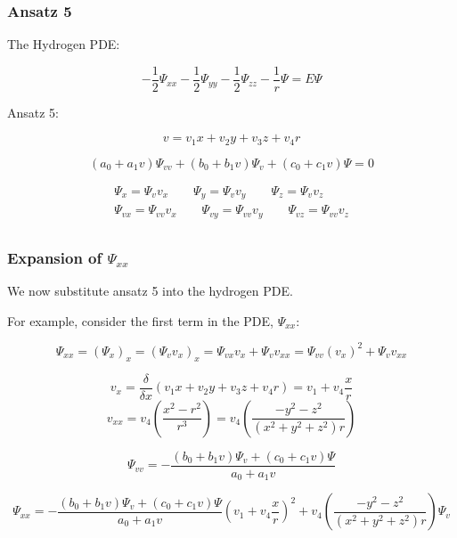 \documentclass{beamer}
\begin{document}
\begin{frame}
\frametitle{Ansatz 5}

\begin{center}

The Hydrogen PDE:

\[ - \frac{1}{2} \Psi_{xx} - \frac{1}{2} \Psi_{yy} - \frac{1}{2} \Psi_{zz} - \frac{1}{r} \Psi = E \Psi \]

\vskip 10pt

Ansatz 5:

\begin{equation*}
\label{ansatz 5a}
v = v_1 x + v_2 y + v_3 z + v_4 r
\end{equation*}

\begin{equation*}
\label{ansatz 5b}
(a_0 + a_1 v) \Psi_{vv} + (b_0 + b_1 v) \Psi_v + (c_0 + c_1 v) \Psi = 0
\end{equation*}

\begin{equation*}
\label{ansatz 5c}
\begin{gathered}
\Psi_x = \Psi_v v_x \qquad
\Psi_y = \Psi_v v_y \qquad
\Psi_z = \Psi_v v_z \\
\Psi_{vx} = \Psi_{vv} v_x \qquad
\Psi_{vy} = \Psi_{vv} v_y \qquad
\Psi_{vz} = \Psi_{vv} v_z \\
\end{gathered}
\end{equation*}

\end{center}

\end{frame}

\begin{frame}
\frametitle{Expansion of $\Psi_{xx}$}

We now substitute ansatz 5 into the hydrogen PDE.

\vskip 12pt

For example, consider the first term in the PDE, $\Psi_{xx}$:

\[ \Psi_{xx} = (\Psi_x)_x = (\Psi_v v_x)_x = \Psi_{vx} v_x + \Psi_v v_{xx} = \Psi_{vv} (v_x)^2 + \Psi_v v_{xx} \]

\[ v_x = \frac{\delta}{\delta x}\left(v_1 x + v_2 y + v_3 z + v_4 r\right) = v_1 + v_4 \frac{x}{r} \]
\[ v_{xx} = v_4 \left(\frac{x^2-r^2}{r^3}\right) = v_4 \left(\frac{-y^2-z^2}{(x^2+y^2+z^2)r}\right) \]

\[ \Psi_{vv} = - \frac{ (b_0 + b_1 v) \Psi_v + (c_0 + c_1 v) \Psi } {a_0 + a_1 v} \]


\small
\[ \Psi_{xx} = - \frac{ (b_0 + b_1 v) \Psi_v + (c_0 + c_1 v) \Psi } {a_0 + a_1 v} \left( v_1 + v_4 \frac{x}{r} \right)^2 + v_4 \left(\frac{-y^2-z^2}{(x^2+y^2+z^2)r}\right) \Psi_v \]

\end{frame}
\end{document}
